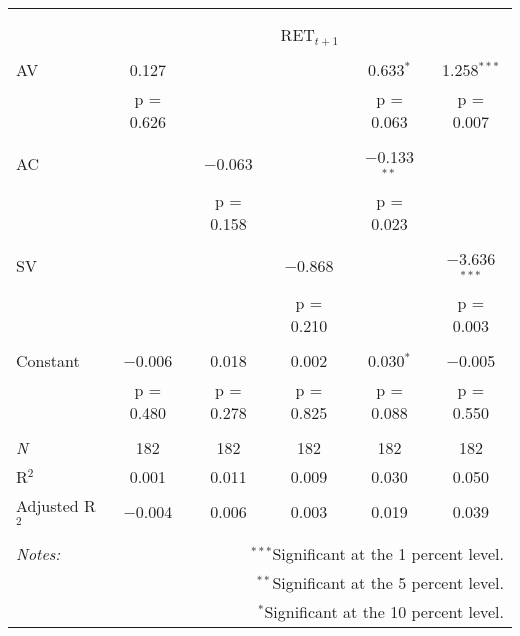 
\begin{tabular}{@{\extracolsep{5pt}}lccccc} 
\\[-1.8ex]\hline 
\hline \\[-1.8ex] 
\\[-1.8ex] & \multicolumn{5}{c}{RET$_{t+1}$} \\ 
\hline \\[-1.8ex] 
 AV & 0.127 &  &  & 0.633$^{*}$ & 1.258$^{***}$ \\ 
  & p = 0.626 &  &  & p = 0.063 & p = 0.007 \\ 
  & & & & & \\ 
 AC &  & $-$0.063 &  & $-$0.133$^{**}$ &  \\ 
  &  & p = 0.158 &  & p = 0.023 &  \\ 
  & & & & & \\ 
 SV &  &  & $-$0.868 &  & $-$3.636$^{***}$ \\ 
  &  &  & p = 0.210 &  & p = 0.003 \\ 
  & & & & & \\ 
 Constant & $-$0.006 & 0.018 & 0.002 & 0.030$^{*}$ & $-$0.005 \\ 
  & p = 0.480 & p = 0.278 & p = 0.825 & p = 0.088 & p = 0.550 \\ 
  & & & & & \\ 
\textit{N} & 182 & 182 & 182 & 182 & 182 \\ 
R$^{2}$ & 0.001 & 0.011 & 0.009 & 0.030 & 0.050 \\ 
Adjusted R$^{2}$ & $-$0.004 & 0.006 & 0.003 & 0.019 & 0.039 \\ 
\hline 
\hline \\[-1.8ex] 
\textit{Notes:} & \multicolumn{5}{r}{$^{***}$Significant at the 1 percent level.} \\ 
 & \multicolumn{5}{r}{$^{**}$Significant at the 5 percent level.} \\ 
 & \multicolumn{5}{r}{$^{*}$Significant at the 10 percent level.} \\ 
\end{tabular} 
